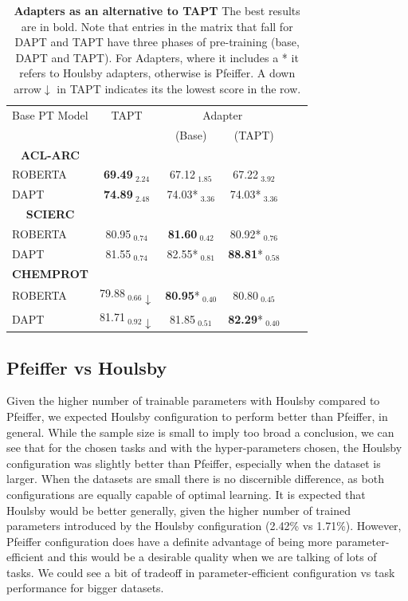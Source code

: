 \documentclass[draft,10pt,twocolumn,letterpaper]{article}
\begin{document}
\begin{table}[H]
    \centering
    \label{table:adapters_vs_tapt}
    \begin{tabular}{@{}lccccc@{}}
    \hline
    Base PT Model & TAPT & \multicolumn{2}{c}{Adapter} \\
    \cmidrule(lr){2-2} \cmidrule(lr){3-4}
    & & (Base) & (TAPT) \\
    \multicolumn{1}{c}{\textbf{ACL-ARC}} \\
    ROBERTA & \textbf{69.49}$_{\text{ 2.24}}$ & 67.12$_{\text{ 1.85}}$ & 67.22$_{\text{ 3.92}}$ \\
     DAPT & \textbf{74.89}$_{\text{ 2.48}}$ & 74.03*$_{\text{ 3.36}}$ & 74.03*$_{\text{ 3.36}}$ \\
    \hline
    \multicolumn{1}{c}{\textbf{SCIERC}}\\
    ROBERTA & 80.95$_{\text{ 0.74}}$ & \textbf{81.60}$_{\text{ 0.42}}$ & 80.92*$_{\text{ 0.76}}$ \\
    DAPT & 81.55$_{\text{ 0.74}}$ & 82.55*$_{\text{ 0.81}}$ & \textbf{88.81}*$_{\text{ 0.58}}$ \\
    \hline
    \multicolumn{1}{c}{\textbf{CHEMPROT}}\\
    ROBERTA & 79.88$_{\text{ 0.66}}\downarrow$ & \textbf{80.95}*$_{\text{ 0.40}}$ & 80.80$_{\text{ 0.45}}$ \\
    DAPT & 81.71$_{\text{ 0.92}}\downarrow$ & 81.85$_{\text{ 0.51}}$ & \textbf{82.29}*$_{\text{ 0.40}}$ \\
\end{tabular}
\caption{\textbf{Adapters as an alternative to TAPT} The best results are in bold. Note that entries in the matrix that fall for DAPT and TAPT have three phases of pre-training (base, DAPT and TAPT). For Adapters, where it includes a * it refers to Houlsby adapters, otherwise is Pfeiffer. A down arrow$\downarrow$ in TAPT indicates its the lowest score in the row.}
\end{table}


\subsection{Pfeiffer vs Houlsby} Given the higher number of trainable parameters with Houlsby compared to Pfeiffer, we expected Houlsby configuration to perform better than Pfeiffer, in general. While the sample size is small to imply too broad a conclusion, we can see that for the chosen tasks and with the hyper-parameters chosen, the Houlsby configuration was slightly better than Pfeiffer, especially when the dataset is larger. When the datasets are small there is no discernible difference, as both configurations are equally capable of optimal learning. It is expected that Houlsby would be better generally, given the higher number of trained parameters introduced by the Houlsby configuration (2.42\% vs 1.71\%). However, Pfeiffer configuration does have a definite advantage of being more parameter-efficient and this would be a desirable quality when we are talking of lots of tasks. We could see a bit of tradeoff in parameter-efficient configuration vs task performance for bigger datasets.
\end{document}
